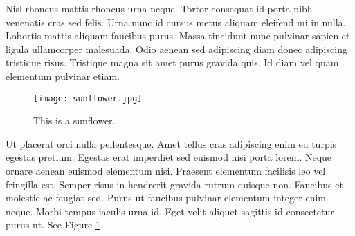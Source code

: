 \documentclass{article}
\begin{document}
 Nisl rhoncus mattis rhoncus urna neque. Tortor consequat id porta nibh venenatis cras sed felis. Urna nunc id cursus metus aliquam eleifend mi in nulla. Lobortis mattis aliquam faucibus purus. Massa tincidunt nunc pulvinar sapien et ligula ullamcorper malesuada. Odio aenean sed adipiscing diam donec adipiscing tristique risus. Tristique magna sit amet purus gravida quis. Id diam vel quam elementum pulvinar etiam.


\begin{figure}
\begin{center}
\texttt{[image: sunflower.jpg]}
\caption{This is a sunflower.} 
\label{fig: sunflower}
\end{center}  
\end{figure}

Ut placerat orci nulla pellentesque. Amet tellus cras adipiscing enim eu turpis egestas pretium. Egestas erat imperdiet sed euismod nisi porta lorem. Neque ornare aenean euismod elementum nisi. Praesent elementum facilisis leo vel fringilla est. Semper risus in hendrerit gravida rutrum quisque non. Faucibus et molestie ac feugiat sed. Purus ut faucibus pulvinar elementum integer enim neque. Morbi tempus iaculis urna id. Eget velit aliquet sagittis id consectetur purus ut. See Figure \ref{fig: sunflower}.
\end{document}
